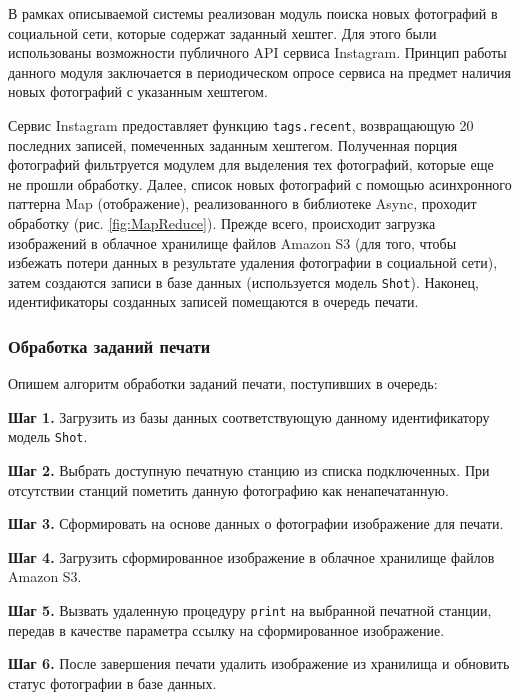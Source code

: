 \documentclass[a4paper,14pt,href]{article}
\begin{document}
В рамках описываемой системы реализован модуль поиска новых фотографий в социальной сети, которые содержат заданный
хештег. Для этого были использованы возможности публичного API сервиса Instagram. Принцип работы данного модуля заключается
в периодическом опросе сервиса на предмет наличия новых фотографий с указанным хештегом.

Сервис Instagram предоставляет функцию \texttt{tags.recent}, возвращающую 20 последних записей, помеченных заданным
хештегом. Полученная порция фотографий фильтруется модулем для выделения тех фотографий, которые еще не прошли обработку.
Далее, список новых фотографий с помощью асинхронного паттерна Map (отображение), реализованного в библиотеке
Async\cite{Async}, проходит обработку (рис. \ref{fig:MapReduce}). Прежде всего, происходит загрузка изображений в
облачное хранилище файлов Amazon S3 (для того, чтобы избежать потери данных в результате удаления фотографии в социальной сети),
затем создаются записи в базе данных (используется модель \texttt{Shot}). Наконец, идентификаторы созданных записей помещаются
в очередь печати.

\subsubsection{Обработка заданий печати}
Опишем алгоритм обработки заданий печати, поступивших в очередь:
\begin{description}
  \item \textbf{Шаг 1.} Загрузить из базы данных соответствующую данному идентификатору модель \texttt{Shot}.
  \item \textbf{Шаг 2.} Выбрать доступную печатную станцию из списка подключенных. При отсутствии станций пометить
    данную фотографию как ненапечатанную.
  \item \textbf{Шаг 3.} Сформировать на основе данных о фотографии изображение для печати.
  \item \textbf{Шаг 4.} Загрузить сформированное изображение в облачное хранилище файлов Amazon S3.
  \item \textbf{Шаг 5.} Вызвать удаленную процедуру \texttt{print} на выбранной печатной станции, передав в качестве
    параметра ссылку на сформированное изображение.
  \item \textbf{Шаг 6.} После завершения печати удалить изображение из хранилища и обновить статус фотографии в базе
    данных.
\end{description}
\end{document}
